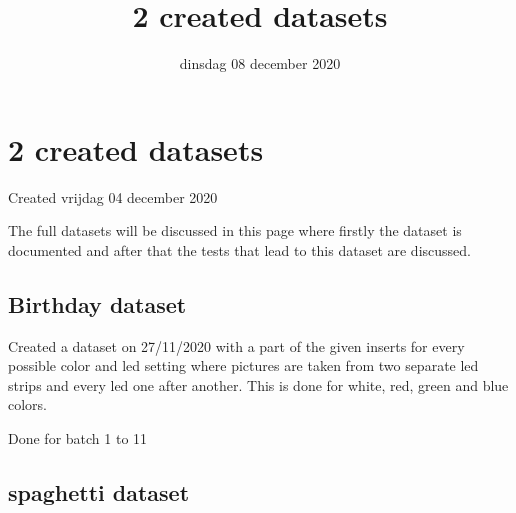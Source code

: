 \documentclass{scrartcl}
\title{2 created datasets}
\date{dinsdag 08 december 2020}
\author{}
\begin{document}
\maketitle

		\section{2 created datasets}

Created vrijdag 04 december 2020



The full datasets will be discussed in this page where firstly the dataset is documented and after that the tests that lead to this dataset are discussed.



\subsection{Birthday dataset}

Created a dataset on 27/11/2020 with a part of the given inserts for every possible color and led setting where pictures are taken from two separate led strips and every led one after another. This is done for white, red, green and blue colors. 

Done for batch 1 to 11





\subsection{spaghetti dataset}
\end{document}
